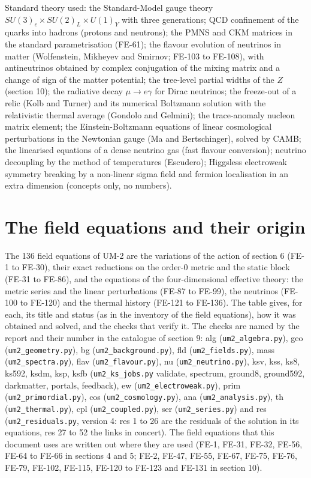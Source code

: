 \documentclass[
  10pt,
]{article}
\begin{document}
Standard theory used: the Standard-Model gauge theory
\(SU(3)_c\times SU(2)_L\times U(1)_Y\) with three generations; QCD
confinement of the quarks into hadrons (protons and neutrons); the PMNS
and CKM matrices in the standard parametrisation (FE-61); the flavour
evolution of neutrinos in matter (Wolfenstein, Mikheyev and Smirnov;
FE-103 to FE-108), with antineutrinos obtained by complex conjugation of
the mixing matrix and a change of sign of the matter potential; the
tree-level partial widths of the \(Z\) (section 10); the radiative decay
\(\mu \to e\gamma\) for Dirac neutrinos; the freeze-out of a relic (Kolb
and Turner) and its numerical Boltzmann solution with the relativistic
thermal average (Gondolo and Gelmini); the trace-anomaly nucleon matrix
element; the Einstein-Boltzmann equations of linear cosmological
perturbations in the Newtonian gauge (Ma and Bertschinger), solved by
CAMB; the linearised equations of a dense neutrino gas (fast flavour
conversion); neutrino decoupling by the method of temperatures
(Escudero); Higgsless electroweak symmetry breaking by a non-linear
sigma field and fermion localisation in an extra dimension (concepts
only, no numbers).

\hypertarget{the-field-equations-and-their-origin}{%
\section{The field equations and their
origin}\label{the-field-equations-and-their-origin}}

The 136 field equations of UM-2 are the variations of the action of
section 6 (FE-1 to FE-30), their exact reductions on the order-0 metric
and the static block (FE-31 to FE-86), and the equations of the
four-dimensional effective theory: the metric series and the linear
perturbations (FE-87 to FE-99), the neutrinos (FE-100 to FE-120) and the
thermal history (FE-121 to FE-136). The table gives, for each, its title
and status (as in the inventory of the field equations), how it was
obtained and solved, and the checks that verify it. The checks are named
by the report and their number in the catalogue of section 9: alg
(\texttt{um2\_algebra.py}), geo (\texttt{um2\_geometry.py}), bg
(\texttt{um2\_background.py}), fld (\texttt{um2\_fields.py}), mass
(\texttt{um2\_spectra.py}), flav (\texttt{um2\_flavour.py}), nu
(\texttt{um2\_neutrino.py}), ksv, kss, ks8, ks592, ksdm, ksp, ksfb
(\texttt{um2\_ks\_jobs.py} validate, spectrum, ground8, ground592,
darkmatter, portals, feedback), ew (\texttt{um2\_electroweak.py}), prim
(\texttt{um2\_primordial.py}), cos (\texttt{um2\_cosmology.py}), ana
(\texttt{um2\_analysis.py}), th (\texttt{um2\_thermal.py}), cpl
(\texttt{um2\_coupled.py}), ser (\texttt{um2\_series.py}) and res
(\texttt{um2\_residuals.py}, version 4: res 1 to 26 are the residuals of
the solution in its equations, res 27 to 52 the links in concert). The
field equations that this document uses are written out where they are
used (FE-1, FE-31, FE-32, FE-56, FE-64 to FE-66 in sections 4 and 5;
FE-2, FE-47, FE-55, FE-67, FE-75, FE-76, FE-79, FE-102, FE-115, FE-120
to FE-123 and FE-131 in section 10).
\end{document}
